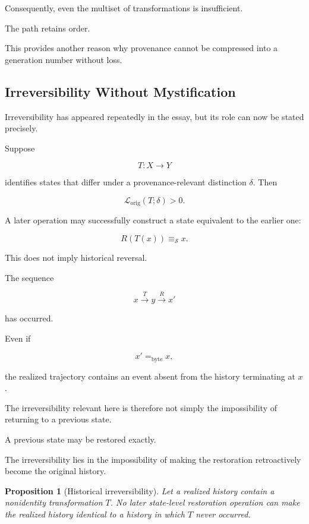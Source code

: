 \documentclass[
  11pt,
  a4paper,
  DIV=12,
  BCOR=0mm,
  parskip=half-
]{scrartcl}
\newcommand{\eqbyte}{=_{\mathrm{byte}}}
\newcommand{\lossorig}{%
  \mathscr L_{\mathrm{orig}}%
}
\theoremstyle{definition}
\theoremstyle{plain}
\newtheorem{proposition}[definition]{Proposition}
\theoremstyle{remark}
\begin{document}
Consequently, even the multiset of transformations is insufficient.

The path retains order.

This provides another reason why provenance cannot be compressed into a
generation number without loss.


\subsection{Irreversibility Without Mystification}
\label{sec:irreversibility-synthesis}

Irreversibility has appeared repeatedly in the essay, but its role can now be
stated precisely.

Suppose

\[
  T:X\rightarrow Y
\]

identifies states that differ under a provenance-relevant distinction
\(\delta\). Then

\[
  \lossorig(T;\delta)>0.
\]

A later operation may successfully construct a state equivalent to the
earlier one:

\[
  R(T(x))\equiv_{\mathcal S}x.
\]

This does not imply historical reversal.

The sequence

\[
  x
  \xrightarrow{T}
  y
  \xrightarrow{R}
  x'
\]

has occurred.

Even if

\[
  x'\eqbyte x,
\]

the realized trajectory contains an event absent from the history terminating
at \(x\).

The irreversibility relevant here is therefore not simply the impossibility of
returning to a previous state.

A previous state may be restored exactly.

The irreversibility lies in the impossibility of making the restoration
retroactively become the original history.

\begin{proposition}[Historical irreversibility]
\label{prop:historical-irreversibility}
Let a realized history contain a nonidentity transformation \(T\). No later
state-level restoration operation can make the realized history identical to
a history in which \(T\) never occurred.
\end{proposition}
\end{document}
